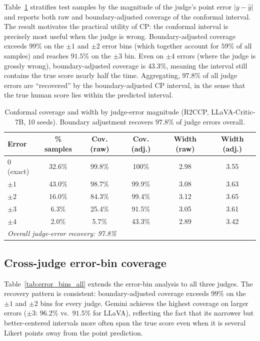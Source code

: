\documentclass{article}
\begin{document}
Table~\ref{tab:error_bins} stratifies test samples by the magnitude of the judge's point error $|y - \hat{y}|$ and reports both raw and boundary-adjusted coverage of the conformal interval. The result motivates the practical utility of CP: the conformal interval is precisely most useful when the judge is wrong. Boundary-adjusted coverage exceeds 99\% on the $\pm 1$ and $\pm 2$ error bins (which together account for $59\%$ of all samples) and reaches $91.5\%$ on the $\pm 3$ bin. Even on $\pm 4$ errors (where the judge is grossly wrong), boundary-adjusted coverage is $43.3\%$, meaning the interval still contains the true score nearly half the time. Aggregating, $97.8\%$ of all judge errors are ``recovered'' by the boundary-adjusted CP interval, in the sense that the true human score lies within the predicted interval.

\begin{table}[t]
\centering
\caption{Conformal coverage and width by judge-error magnitude (R2CCP, LLaVA-Critic-7B, 10 seeds). Boundary adjustment recovers $97.8\%$ of judge errors overall.}
\label{tab:error_bins}
\small
\begin{tabular}{lccccc}
\toprule
\textbf{Error} & \textbf{\% samples} & \textbf{Cov. (raw)} & \textbf{Cov. (adj.)} & \textbf{Width (raw)} & \textbf{Width (adj.)} \\
\midrule
0 (exact) & 32.6\% & 99.8\% & 100\% & 2.98 & 3.55 \\
$\pm 1$ & 43.0\% & 98.7\% & 99.9\% & 3.08 & 3.63 \\
$\pm 2$ & 16.0\% & 84.3\% & 99.4\% & 3.12 & 3.65 \\
$\pm 3$ & 6.3\% & 25.4\% & 91.5\% & 3.05 & 3.61 \\
$\pm 4$ & 2.0\% & 5.7\% & 43.3\% & 2.89 & 3.42 \\
\midrule
\multicolumn{6}{l}{\emph{Overall judge-error recovery: 97.8\%}} \\
\bottomrule
\end{tabular}
\end{table}

\subsection{Cross-judge error-bin coverage}
\label{app:cross_judge_errors}

Table~\ref{tab:error_bins_all} extends the error-bin analysis to all three judges. The recovery pattern is consistent: boundary-adjusted coverage exceeds $99\%$ on the $\pm 1$ and $\pm 2$ bins for every judge. Gemini achieves the highest coverage on larger errors ($\pm 3$: $96.2\%$ vs.\ $91.5\%$ for LLaVA), reflecting the fact that its narrower but better-centered intervals more often span the true score even when it is several Likert points away from the point prediction.
\end{document}
